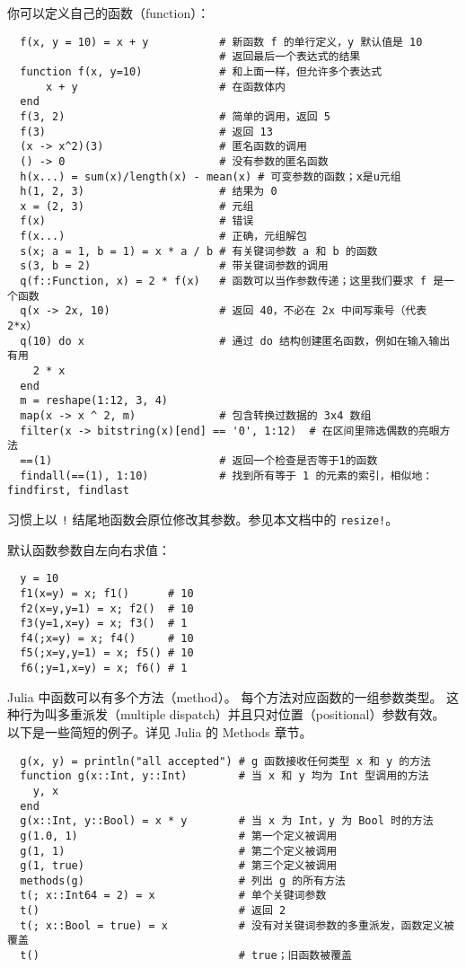 \documentclass[10pt,a4paper]{article}
\begin{document}
你可以定义自己的函数（function）：
\begin{lstlisting}
  f(x, y = 10) = x + y           # 新函数 f 的单行定义，y 默认值是 10
                                 # 返回最后一个表达式的结果
  function f(x, y=10)            # 和上面一样，但允许多个表达式
      x + y                      # 在函数体内
  end
  f(3, 2)                        # 简单的调用，返回 5
  f(3)                           # 返回 13
  (x -> x^2)(3)                  # 匿名函数的调用
  () -> 0                        # 没有参数的匿名函数
  h(x...) = sum(x)/length(x) - mean(x) # 可变参数的函数；x是u元组
  h(1, 2, 3)                     # 结果为 0
  x = (2, 3)                     # 元组
  f(x)                           # 错误
  f(x...)                        # 正确，元组解包
  s(x; a = 1, b = 1) = x * a / b # 有关键词参数 a 和 b 的函数
  s(3, b = 2)                    # 带关键词参数的调用
  q(f::Function, x) = 2 * f(x)   # 函数可以当作参数传递；这里我们要求 f 是一个函数
  q(x -> 2x, 10)                 # 返回 40，不必在 2x 中间写乘号（代表 2*x）
  q(10) do x                     # 通过 do 结构创建匿名函数，例如在输入输出有用
    2 * x
  end
  m = reshape(1:12, 3, 4)
  map(x -> x ^ 2, m)             # 包含转换过数据的 3x4 数组
  filter(x -> bitstring(x)[end] == '0', 1:12)  # 在区间里筛选偶数的亮眼方法
  ==(1)                          # 返回一个检查是否等于1的函数
  findall(==(1), 1:10)           # 找到所有等于 1 的元素的索引，相似地：findfirst, findlast
\end{lstlisting}

习惯上以 \lstinline|!| 结尾地函数会原位修改其参数。参见本文档中的 \lstinline|resize!|。

默认函数参数自左向右求值：
\begin{lstlisting}
  y = 10
  f1(x=y) = x; f1()      # 10
  f2(x=y,y=1) = x; f2()  # 10
  f3(y=1,x=y) = x; f3()  # 1
  f4(;x=y) = x; f4()     # 10
  f5(;x=y,y=1) = x; f5() # 10
  f6(;y=1,x=y) = x; f6() # 1
\end{lstlisting}

Julia 中\textsf{函数}可以有多个\textsf{方法}（method）。
每个方法对应函数的一组参数类型。
这种行为叫多重派发（multiple dispatch）并且只对位置（positional）参数有效。
以下是一些简短的例子。详见 Julia 的 Methods 章节。
\begin{lstlisting}
  g(x, y) = println("all accepted") # g 函数接收任何类型 x 和 y 的方法
  function g(x::Int, y::Int)        # 当 x 和 y 均为 Int 型调用的方法
    y, x
  end
  g(x::Int, y::Bool) = x * y        # 当 x 为 Int，y 为 Bool 时的方法
  g(1.0, 1)                         # 第一个定义被调用
  g(1, 1)                           # 第二个定义被调用
  g(1, true)                        # 第三个定义被调用
  methods(g)                        # 列出 g 的所有方法
  t(; x::Int64 = 2) = x             # 单个关键词参数
  t()                               # 返回 2
  t(; x::Bool = true) = x           # 没有对关键词参数的多重派发，函数定义被覆盖
  t()                               # true；旧函数被覆盖
\end{lstlisting}
\end{document}
